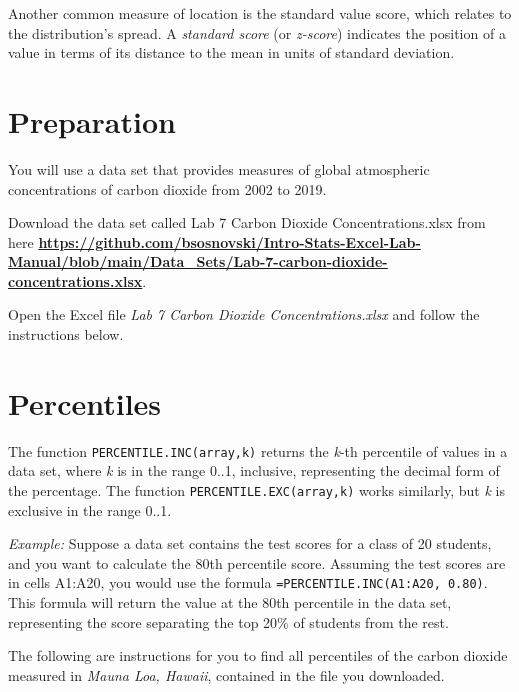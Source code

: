 \documentclass[
]{book}
\begin{document}
Another common measure of location is the standard value score, which relates to the distribution's spread. A \emph{standard score} (or \emph{z-score}) indicates the position of a value in terms of its distance to the mean in units of standard deviation.

\hypertarget{preparation-4}{%
\section{Preparation}\label{preparation-4}}

You will use a data set that provides measures of global atmospheric concentrations of carbon dioxide from 2002 to 2019.

Download the data set called Lab 7 Carbon Dioxide Concentrations.xlsx from here \href{https://github.com/bsosnovski/Intro-Stats-Excel-Lab-Manual/blob/main/Data_Sets/Lab-7-carbon-dioxide-concentrations.xlsx}{\textbf{https://github.com/bsosnovski/Intro-Stats-Excel-Lab-Manual/blob/main/Data\_Sets/Lab-7-carbon-dioxide-concentrations.xlsx}}.

Open the Excel file \emph{Lab 7 Carbon Dioxide Concentrations.xlsx} and follow the instructions below.

\hypertarget{percentiles}{%
\section{Percentiles}\label{percentiles}}

The function \texttt{PERCENTILE.INC(array,k)} returns the \emph{k}-th percentile of values in a data set, where \emph{k} is in the range 0..1, inclusive, representing the decimal form of the percentage. The function \texttt{PERCENTILE.EXC(array,k)} works similarly, but \emph{k} is exclusive in the range 0..1.

\emph{Example:} Suppose a data set contains the test scores for a class of 20 students, and you want to calculate the 80th percentile score. Assuming the test scores are in cells A1:A20, you would use the formula \texttt{=PERCENTILE.INC(A1:A20,\ 0.80)}. This formula will return the value at the 80th percentile in the data set, representing the score separating the top 20\% of students from the rest.

The following are instructions for you to find all percentiles of the carbon dioxide measured in \emph{Mauna Loa, Hawaii}, contained in the file you downloaded.
\end{document}
